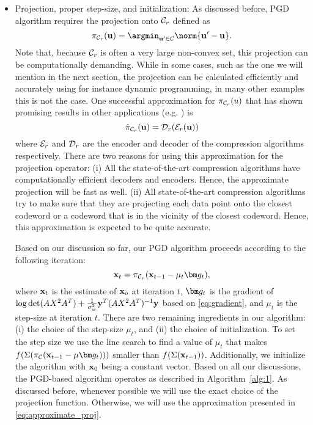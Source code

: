 \documentclass[onecolumn]{IEEEtran}
\begin{document}
\begin{itemize}
\item Projection, proper step-size, and initialization:  As discussed before, PGD algorithm requires the projection onto $\mathcal{C}_r$ defined as
\[
    \pi_{\Cc_r}(\uv) = \argmin_{\uv' \in \Cc} \norm{\uv' - \uv}.
\]
 Note that, because $\mathcal{C}_r$ is often a very large non-convex set, this projection can be computationally demanding. While in some cases, such as the one we will mention in the next section, the projection can be calculated efficiently and accurately using for instance dynamic programming, in many other examples this is not the case. One successful approximation for $\pi_{\mathcal{C}_r}(u)$ that has shown promising results in other applications (e.g. \cite{beygi2019efficient, bakhshizadeh2020using}) is 
 \[
 \hat{\pi}_{\mathcal{C}_r}({\bf u}) = \mathcal{D}_r(\mathcal{E}_r({\bf u}))
 \]
 where $\mathcal{E}_r$ and $\mathcal{D}_r$ are the encoder and decoder of the compression algorithms respectively. There are two reasons for using this approximation for the projection operator: (i) All the state-of-the-art compression algorithms have computationally efficient decoders and encoders. Hence, the approximate projection will be fast as well. (ii) All state-of-the-art compression algorithms try to make sure that they are projecting each data point onto the closest codeword or a codeword that is in the vicinity of the closest codeword. Hence, this approximation is expected to be quite accurate.

Based on our discussion so far, our PGD algorithm proceeds according to the following iteration:
\begin{equation}\label{eq:approximate_proj}
\xv_t= \pi_{\Cc_r}(\xv_{t - 1} - \mu_{t} \gv_t),
\end{equation}
where ${\bf x}_t$ is the estimate of ${\bf x}_o$ at iteration $t$, $\gv_t$ is the gradient of $ \log\det(AX^2A^T)+{1\over \sigma_w^2}{\bf y}^T(AX^2A^T)^{-1}{\bf y}$ based on \eqref{eq:gradient}, and $\mu_t$ is the step-size at iteration $t$. There are two remaining ingredients in our algorithm: (i) the choice of the step-size $\mu_t$, and (ii) the choice of initialization. To set the step size we use the line search to find a value of $\mu_t$ that  makes $f(\Sigma(\pi_\Cc(\xv_{t - 1} - \mu \gv_t)))$ smaller than $f(\Sigma ({\bf x}_{t - 1}))$. Additionally, we initialize the algorithm with ${\bf x}_0$ being a constant vector. Based on all our discussions, the PGD-based algorithm operates as described in Algorithm~\ref{alg:1}. As discussed before, whenever possible we will use the exact choice of the projection function. Otherwise, we will use the approximation presented in \eqref{eq:approximate_proj}.


\end{itemize}
\end{document}
